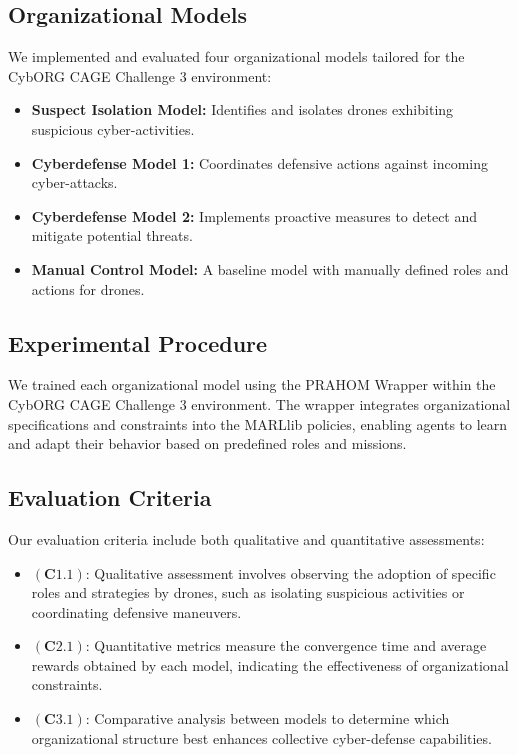 \documentclass[conference]{IEEEtran}
\begin{document}
\subsection{Organizational Models}

We implemented and evaluated four organizational models tailored for the CybORG CAGE Challenge 3 environment:

\begin{itemize}
    \item \textbf{Suspect Isolation Model:} Identifies and isolates drones exhibiting suspicious cyber-activities.
    \item \textbf{Cyberdefense Model 1:} Coordinates defensive actions against incoming cyber-attacks.
    \item \textbf{Cyberdefense Model 2:} Implements proactive measures to detect and mitigate potential threats.
    \item \textbf{Manual Control Model:} A baseline model with manually defined roles and actions for drones.
\end{itemize}

\subsection{Experimental Procedure}

We trained each organizational model using the PRAHOM Wrapper within the CybORG CAGE Challenge 3 environment. The wrapper integrates organizational specifications and constraints into the MARLlib policies, enabling agents to learn and adapt their behavior based on predefined roles and missions.

\subsection{Evaluation Criteria}

Our evaluation criteria include both qualitative and quantitative assessments:

\begin{itemize}
    \item $(\mathbf{C1.1})$: Qualitative assessment involves observing the adoption of specific roles and strategies by drones, such as isolating suspicious activities or coordinating defensive maneuvers.
    \item $(\mathbf{C2.1})$: Quantitative metrics measure the convergence time and average rewards obtained by each model, indicating the effectiveness of organizational constraints.
    \item $(\mathbf{C3.1})$: Comparative analysis between models to determine which organizational structure best enhances collective cyber-defense capabilities.
\end{itemize}
\end{document}
